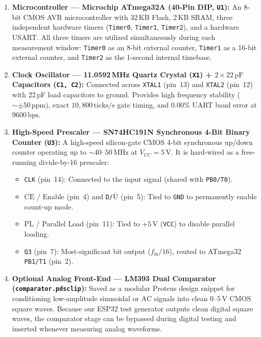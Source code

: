 \documentclass[11pt,a4paper]{article}
\begin{document}
\begin{enumerate}[leftmargin=1.5em]
    \item \textbf{Microcontroller --- Microchip ATmega32A (40-Pin DIP, \texttt{U1}):}
    An 8-bit CMOS AVR microcontroller with 32\,KB Flash, 2\,KB SRAM, three independent hardware timers (\texttt{Timer0}, \texttt{Timer1}, \texttt{Timer2}), and a hardware USART. All three timers are utilized simultaneously during each measurement window: \texttt{Timer0} as an 8-bit external counter, \texttt{Timer1} as a 16-bit external counter, and \texttt{Timer2} as the 1-second internal timebase.

    \item \textbf{Clock Oscillator --- 11.0592\,MHz Quartz Crystal (\texttt{X1}) + $2\times 22\,\text{pF}$ Capacitors (\texttt{C1, C2}):}
    Connected across \texttt{XTAL1} (pin~13) and \texttt{XTAL2} (pin~12) with 22\,pF load capacitors to ground. Provides high frequency stability ($\sim\pm 50\,\text{ppm}$), exact $10{,}800\,\text{ticks/s}$ gate timing, and $0.00\%$ UART baud error at $9600\,\text{bps}$.

    \item \textbf{High-Speed Prescaler --- SN74HC191N Synchronous 4-Bit Binary Counter (\texttt{U3}):}
    A high-speed silicon-gate CMOS 4-bit synchronous up/down counter operating up to $\sim 40\text{--}50\,\text{MHz}$ at $V_{CC} = 5\,\text{V}$. It is hard-wired as a free-running divide-by-16 prescaler:
    \begin{itemize}
        \item \texttt{CLK} (pin~14): Connected to the input signal (shared with \texttt{PB0/T0}).
        \item $\overline{\text{CE}}$ / Enable (pin~4) and \texttt{D/}$\overline{\text{U}}$ (pin~5): Tied to \texttt{GND} to permanently enable count-up mode.
        \item $\overline{\text{PL}}$ / Parallel Load (pin~11): Tied to $+5\,\text{V}$ (\texttt{VCC}) to disable parallel loading.
        \item \texttt{Q3} (pin~7): Most-significant bit output ($f_{\text{in}} / 16$), routed to ATmega32 \texttt{PB1/T1} (pin~2).
    \end{itemize}

    \item \textbf{Optional Analog Front-End --- LM393 Dual Comparator (\texttt{comparator.pdsclip}):}
    Saved as a modular Proteus design snippet for conditioning low-amplitude sinusoidal or AC signals into clean $0\text{--}5\,\text{V}$ CMOS square waves. Because our ESP32 test generator outputs clean digital square waves, the comparator stage can be bypassed during digital testing and inserted whenever measuring analog waveforms.


\end{enumerate}
\end{document}
